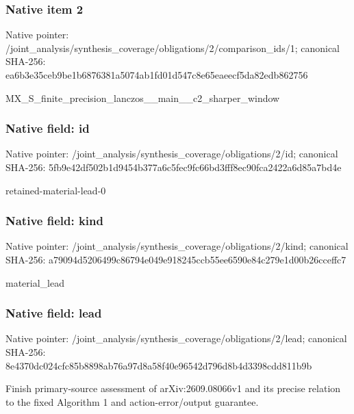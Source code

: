 \documentclass[10pt,a4paper]{article}
\begin{document}
\subsubsection{Native item 2}
Native pointer: /joint\_\allowbreak{}analysis/synthesis\_\allowbreak{}coverage/obligations/2/comparison\_\allowbreak{}ids/1; canonical SHA-256: ea6b3e35ceb9be1b6876381a5074ab1fd01d547c8e65eaeecf5da82edb862756

\begingroup\raggedright\sloppy MX\_\allowbreak{}S\_\allowbreak{}finite\_\allowbreak{}precision\_\allowbreak{}lanczos\_\allowbreak{}\_\allowbreak{}main\_\allowbreak{}\_\allowbreak{}c2\_\allowbreak{}sharper\_\allowbreak{}window\par\endgroup

\subsubsection{Native field: id}
Native pointer: /joint\_\allowbreak{}analysis/synthesis\_\allowbreak{}coverage/obligations/2/id; canonical SHA-256: 5fb9e42df502b1d9454b377a6c5fec9fc66bd3fff8ec90fca2422a6d85a7bd4e

\begingroup\raggedright\sloppy retained-material-lead-0\par\endgroup

\subsubsection{Native field: kind}
Native pointer: /joint\_\allowbreak{}analysis/synthesis\_\allowbreak{}coverage/obligations/2/kind; canonical SHA-256: a79094d5206499c86794e049e918245ccb55ee6590e84c279e1d00b26cceffc7

\begingroup\raggedright\sloppy material\_\allowbreak{}lead\par\endgroup

\subsubsection{Native field: lead}
Native pointer: /joint\_\allowbreak{}analysis/synthesis\_\allowbreak{}coverage/obligations/2/lead; canonical SHA-256: 8e4370dc024cfc85b8898ab76a97d8a58f40e96542d796d8b4d3398cdd811b9b

\begingroup\raggedright\sloppy Finish primary-source assessment of arXiv:\allowbreak{}2609.08066v1 and its precise relation to the fixed Algorithm 1 and action-error/\allowbreak{}output guarantee.\par\endgroup
\end{document}
